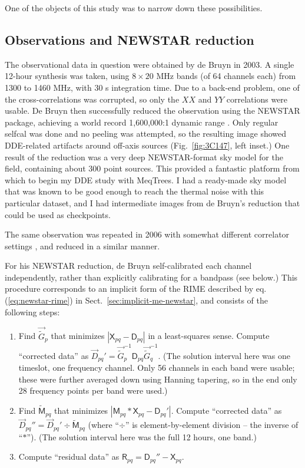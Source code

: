 \documentclass[]{aa}
\newcommand{\jones}[2]{\vec {#1}_{#2}}
\newcommand{\jonesinv}[2]{\vec {#1}^{-1}_{#2}}
\newcommand{\coh}[2]{\mathsf{{#1}}_{{#2}}}
\begin{document}
One of the objects of this study was to narrow down these possibilities.

\subsection{Observations and NEWSTAR reduction}

The observational data in question were obtained by de Bruyn in 2003. A single 12-hour synthesis was taken, using $8\times20$ MHz bands (of 64 channels each) from 1300 to 1460 MHz, with 30 s integration time. Due to a back-end problem, one of the cross-correlations was corrupted, so only the $XX$ and $YY$ correlations were usable. De Bruyn then successfully reduced the observation using the NEWSTAR package, achieving a world record 1,600,000:1 dynamic range \citep{deBruyn:3C147}. Only regular selfcal was done and no peeling was attempted, so the resulting image showed DDE-related artifacts around off-axis sources (Fig.~\ref{fig:3C147}, left inset.) One result of the reduction was a very deep NEWSTAR-format sky model for the field, containing about 300 point sources. This provided a fantastic platform from which to begin my DDE study with MeqTrees. I had a ready-made sky model that was known to be good enough to reach the thermal noise with this particular dataset, and I had intermediate images from de Bruyn's reduction that could be used as checkpoints.

The same observation was repeated in 2006 with somewhat different correlator settings \citep[for details, see]{deBruyn:3C147}, and reduced in a similar manner.

For his NEWSTAR reduction, de Bruyn self-calibrated each channel independently, rather than explicitly calibrating for a bandpass (see below.) This procedure corresponds to an implicit form of the RIME described by eq. (\ref{eq:newstar-rime}) in Sect.~\ref{sec:implicit-me-newstar}, and consists of the following steps:

\begin{enumerate}
\item Find $\jones{\tilde{G}}{p}$ that minimizes $|\coh{X}{pq} - \coh{D}{pq}|$ in a least-squares sense. Compute ``corrected data'' as $\jones{D}{pq}' = \jonesinv{\tilde{G}}{p} \coh{D}{pq} \jonesinv{\tilde{G}}{q}.$ (The solution interval here was one timeslot, one frequency channel. Only 56 channels in each band were usable; these were further averaged down using Hanning tapering, so in the end only 28 frequency points per band were used.)

\item Find $\coh{\tilde{M}}{pq}$ that minimizes $|\coh{M}{pq} \ast \coh{X}{pq} - \coh{D}{pq}'|$.
Compute ``corrected data'' as $\jones{D}{pq}'' = \jones{D}{pq}' \div \coh{\tilde{M}}{pq}$ (where ``$\div$'' is element-by-element division -- the inverse of ``$\ast$''). (The solution interval here was the full 12 hours, one band.)

\item Compute ``residual data'' as $\coh{R}{pq} = \coh{D}{pq}'' - \coh{X}{pq}$. 
\end{enumerate}
\end{document}
